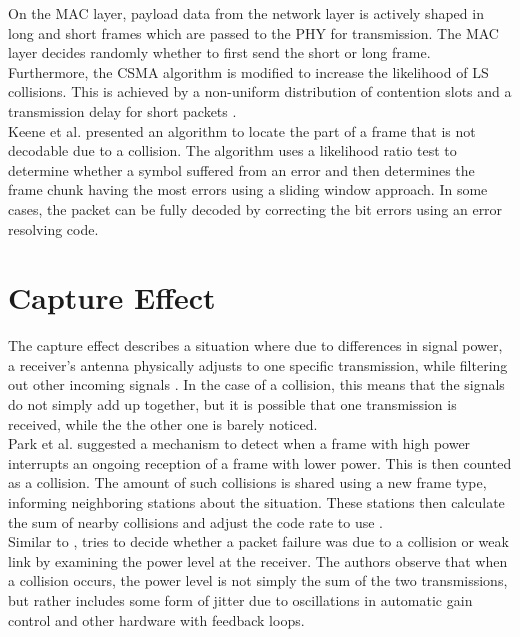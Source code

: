 On the \gls{MAC} layer, payload data from the network layer is actively shaped in long and short frames which are passed to the \gls{PHY} for transmission. The \gls{MAC} layer decides randomly whether to first send the short or long frame. Furthermore, the \gls{CSMA} algorithm is modified to increase the likelihood of LS collisions. This is achieved by a non-uniform distribution of contention slots and a transmission delay for short packets \cite{wu2010}.\\

Keene et al. \cite{keene2010} presented an algorithm to locate the part of a frame that is not decodable due to a collision. The algorithm uses a likelihood ratio test to determine whether a symbol suffered from an error and then determines the frame chunk having the most errors using a sliding window approach. In some cases, the packet can be fully decoded by correcting the bit errors using an error resolving code.



\section{Capture Effect}\label{sec:related-capture}

The capture effect describes a situation where due to differences in signal power, a receiver's antenna physically adjusts to one specific transmission, while filtering out other incoming signals \cite{kim1999}. In the case of a collision, this means that the signals do not simply add up together, but it is possible that one transmission is received, while the the other one is barely noticed.\\

Park et al. suggested a mechanism to detect when a frame with high power interrupts an ongoing reception of a frame with lower power. This is then counted as a collision. The amount of such collisions is shared using a new frame type, informing neighboring stations about the situation. These stations then calculate the sum of nearby collisions and adjust the code rate to use \cite{park2009}.\\

Similar to \cite{zhu2016}, \cite{chua2016} tries to decide whether a packet failure was due to a collision or weak link by examining the power level at the receiver. The authors observe that when a collision occurs, the power level is not simply the sum of the two transmissions, but rather includes some form of jitter due to oscillations in automatic gain control and other hardware with feedback loops.\\

